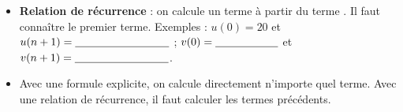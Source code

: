 \documentclass[12pt,a4paper]{article}
\begin{document}
\begin{bilan}
\begin{itemize}[leftmargin=1.2em]
\item \textbf{Relation de récurrence} : on calcule un terme à partir du terme \trou{3cm}. Il faut connaître le premier terme. Exemples : $u(0) = 20$ et $u(n+1) = \trou{3cm}$ ; $v(0) = \trou{2cm}$ et $v(n+1) = \trou{3cm}$.
\item Avec une formule explicite, on calcule directement n'importe quel terme. Avec une relation de récurrence, il faut calculer \trou{4cm} les termes précédents.
\end{itemize}
\end{bilan}
\end{document}
